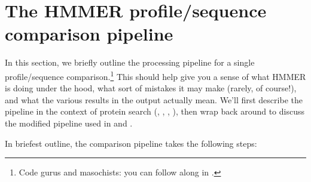 
\section{The HMMER profile/sequence comparison pipeline}
\label{section:pipeline}
\setcounter{footnote}{0}

In this section, we briefly outline the processing pipeline for a
single profile/sequence comparison.\footnote{Code gurus and
  masochists: you can follow along in .} This
should help give you a sense of what HMMER is doing under the hood,
what sort of mistakes it may make (rarely, of course!), and what the
various results in the output actually mean. We'll first describe the 
pipeline in the context of protein search (, ,
, ), then wrap back around to discuss the
modified pipeline used in  and .


In briefest outline, the comparison pipeline takes the following
steps:

